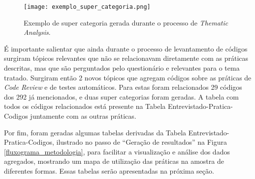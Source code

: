 \begin{figure*}[ht]
\begin{center}
\texttt{[image: exemplo\_super\_categoria.png]}
\end{center}
\caption[Exemplo de super categoria]{
    Exemplo de super categoria gerada durante o processo de \emph{Thematic Analysis}.
}\label{exemplo_super_categoria}
\end{figure*}

É importante salientar que ainda durante o processo de levantamento de códigos surgiram tópicos relevantes que não se relacionavam diretamente com as práticas descritas, mas que são perguntados pelo questionário e relevantes para o tema tratado. Surgiram então 2 novos tópicos que agregam códigos sobre as práticas de \emph{Code Review} e de testes automáticos. Para estas foram relacionados 29 códigos dos 292 já mencionados, e duas super categorias foram geradas. A tabela com todos os códigos relacionados está presente na Tabela Entrevistado-Pratica-Codigos juntamente com as outras práticas.

Por fim, foram geradas algumas tabelas derivadas da Tabela Entrevistado-Pratica-Codigos, ilustrado no passo de ``Geração de resultados'' na Figura \ref{fluxograma_metodologia}, para facilitar a visualização e análise dos dados agregados, mostrando um mapa de utilização das práticas na amostra de diferentes formas. Essas tabelas serão apresentadas na próxima seção.
